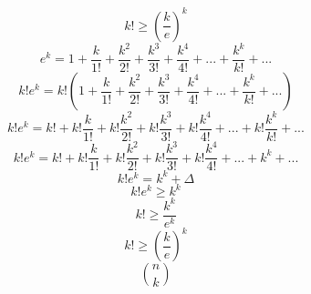 \documentclass{article}
\begin{document}
	\begin{equation}
	k! \ge (\frac{k}{e})^k
	\end{equation}
	\begin{equation}
	e^k = 1 + \frac{k}{1!} + \frac{k^2}{2!} + \frac{k^3}{3!} + \frac{k^4}{4!} + ... + \frac{k^k}{k!} + ...
	\end{equation}
	\begin{equation}
	k!e^k = k!(1 + \frac{k}{1!} + \frac{k^2}{2!} + \frac{k^3}{3!} + \frac{k^4}{4!} + ... + \frac{k^k}{k!} + ...)
	\end{equation}
	\begin{equation}
	k!e^k = k! + k!\frac{k}{1!} + k!\frac{k^2}{2!} + k!\frac{k^3}{3!} + k!\frac{k^4}{4!} + ... + k!\frac{k^k}{k!} + ...
	\end{equation}
	\begin{equation}
	k!e^k = k! + k!\frac{k}{1!} + k!\frac{k^2}{2!} + k!\frac{k^3}{3!} + k!\frac{k^4}{4!} + ... + k^k + ...
	\end{equation}
	\begin{equation}
	k!e^k = k^k + \Delta
	\end{equation}
	\begin{equation}
	k!e^k \ge k^k
	\end{equation}
	\begin{equation}
	k! \ge \frac{k^k}{e^k}
	\end{equation}
	\begin{equation}
	k! \ge (\frac{k}{e})^k
	\end{equation}
	\begin{equation}
	{n \choose k}
	\end{equation}
\end{document}
